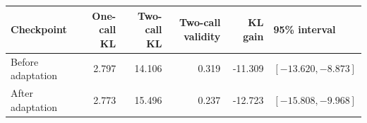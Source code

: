 \begin{tabular}{@{}lrrrrl@{}}
\toprule
Checkpoint & One-call KL & Two-call KL & Two-call validity & KL gain & 95\% interval\\
\midrule
Before adaptation & 2.797 & 14.106 & 0.319 & -11.309 & $[-13.620,-8.873]$\\
After adaptation & 2.773 & 15.496 & 0.237 & -12.723 & $[-15.808,-9.968]$\\
\bottomrule
\end{tabular}
